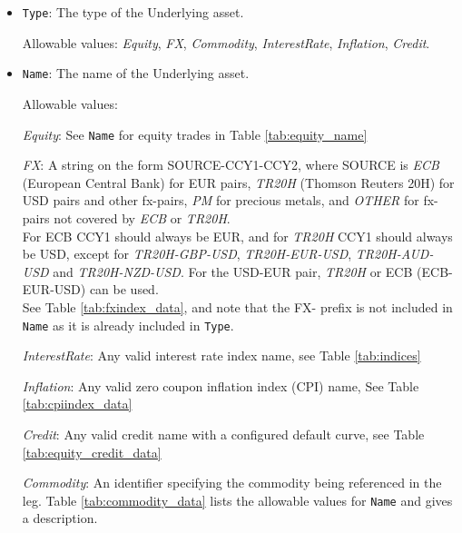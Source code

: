 \begin{itemize}

\item \lstinline!Type!: The type of the Underlying asset.

  Allowable values:  \emph{Equity}, \emph{FX}, \emph{Commodity}, \emph{InterestRate}, \emph{Inflation}, \emph{Credit}.

\item \lstinline!Name!:
  The name of the Underlying asset. 
  
  Allowable values:  

  \emph{Equity}: See \lstinline!Name! for equity trades in Table \ref{tab:equity_name}

  \emph{FX}: A string on the form SOURCE-CCY1-CCY2, where SOURCE is \emph{ECB} (European Central Bank) for EUR pairs, \emph{TR20H} (Thomson Reuters 20H) for USD pairs and other fx-pairs,  \emph{PM} for precious metals, and \emph{OTHER} for fx-pairs not covered by \emph{ECB} or \emph{TR20H}. \\ For ECB CCY1 should always be EUR, and for \emph{TR20H} CCY1 should always be USD, except for
  \emph{TR20H-GBP-USD}, \emph{TR20H-EUR-USD}, \emph{TR20H-AUD-USD} and \emph{TR20H-NZD-USD}. For the USD-EUR pair, \emph{TR20H} or ECB (ECB-EUR-USD) can be used. \\ See Table
  \ref{tab:fxindex_data}, and note that the FX- prefix is not included in \lstinline!Name! as it is already included in \lstinline!Type!.

 \emph{InterestRate}: Any valid interest rate index name, see Table \ref{tab:indices}

 \emph{Inflation}: Any valid zero coupon inflation index (CPI) name, See Table \ref{tab:cpiindex_data}

 \emph{Credit}: Any valid credit name with a configured default curve, see Table \ref{tab:equity_credit_data}

 \emph{Commodity}: An identifier specifying the commodity being referenced in the leg.
Table \ref{tab:commodity_data} lists the allowable values for \lstinline!Name! and gives a description. \\


\end{itemize}
